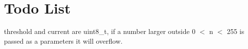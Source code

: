 \chapter{Todo List}
\hypertarget{todo}{}\label{todo}

\begin{DoxyRefList}
\item[Member \doxylink{classbioscara__hardware__interfaces_1_1BioscaraArmHardwareInterface_adf7c055a54ae3c1810743de2296585d4}{bioscara\+\_\+hardware\+\_\+interfaces\+::Bioscara\+Arm\+Hardware\+Interface\+::on\+\_\+init} (const hardware\+\_\+interface\+::\+Hardware\+Component\+Interface\+Params \&params) override]\label{todo__todo000001}%
%
threshold and current are uint8\+\_\+t, if a number larger outside 0 \texorpdfstring{$<$}{<} n \texorpdfstring{$<$}{<} 255 is passed as a parameters it will overflow. 
\end{DoxyRefList}